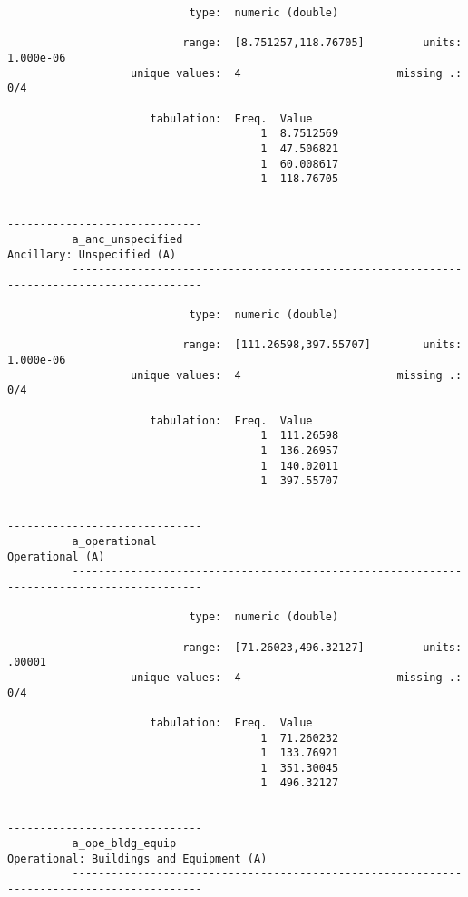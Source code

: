 \documentclass{article}
\begin{document}
\begin{verbatim}
                            type:  numeric (double)
          
                           range:  [8.751257,118.76705]         units:  1.000e-06
                   unique values:  4                        missing .:  0/4
          
                      tabulation:  Freq.  Value
                                       1  8.7512569
                                       1  47.506821
                                       1  60.008617
                                       1  118.76705
          
          ------------------------------------------------------------------------------------------
          a_anc_unspecified                                               Ancillary: Unspecified (A)
          ------------------------------------------------------------------------------------------
          
                            type:  numeric (double)
          
                           range:  [111.26598,397.55707]        units:  1.000e-06
                   unique values:  4                        missing .:  0/4
          
                      tabulation:  Freq.  Value
                                       1  111.26598
                                       1  136.26957
                                       1  140.02011
                                       1  397.55707
          
          ------------------------------------------------------------------------------------------
          a_operational                                                              Operational (A)
          ------------------------------------------------------------------------------------------
          
                            type:  numeric (double)
          
                           range:  [71.26023,496.32127]         units:  .00001
                   unique values:  4                        missing .:  0/4
          
                      tabulation:  Freq.  Value
                                       1  71.260232
                                       1  133.76921
                                       1  351.30045
                                       1  496.32127
          
          ------------------------------------------------------------------------------------------
          a_ope_bldg_equip                                  Operational: Buildings and Equipment (A)
          ------------------------------------------------------------------------------------------
          

\end{verbatim}
\end{document}
